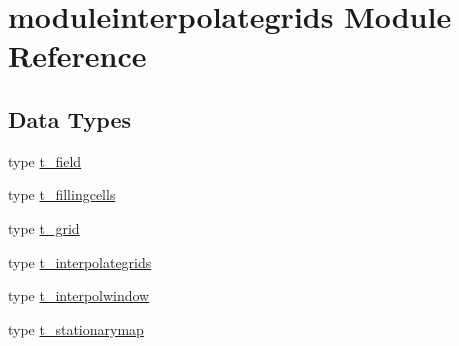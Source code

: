\hypertarget{namespacemoduleinterpolategrids}{}\section{moduleinterpolategrids Module Reference}
\label{namespacemoduleinterpolategrids}
\subsection*{Data Types}
\begin{DoxyCompactItemize}
\item 
type \mbox{\hyperlink{structmoduleinterpolategrids_1_1t__field}{t\+\_\+field}}
\item 
type \mbox{\hyperlink{structmoduleinterpolategrids_1_1t__fillingcells}{t\+\_\+fillingcells}}
\item 
type \mbox{\hyperlink{structmoduleinterpolategrids_1_1t__grid}{t\+\_\+grid}}
\item 
type \mbox{\hyperlink{structmoduleinterpolategrids_1_1t__interpolategrids}{t\+\_\+interpolategrids}}
\item 
type \mbox{\hyperlink{structmoduleinterpolategrids_1_1t__interpolwindow}{t\+\_\+interpolwindow}}
\item 
type \mbox{\hyperlink{structmoduleinterpolategrids_1_1t__stationarymap}{t\+\_\+stationarymap}}
\end{DoxyCompactItemize}
